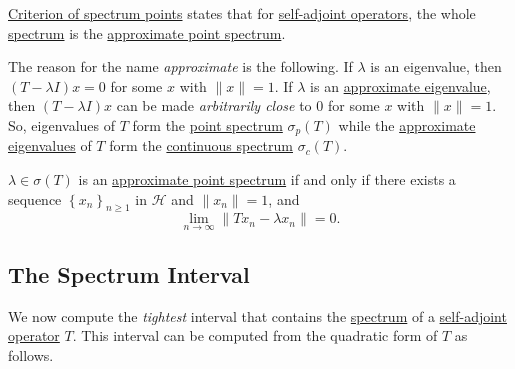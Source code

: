 \hyperref[col:criterion-of-spectrum-points]{Criterion of spectrum points} states that for \hyperref[def:self-adjoint-op]{self-adjoint operators}, the whole \hyperref[def:spectrum-point]{spectrum} is the \hyperref[def:approximate-point-spectrum]{approximate point spectrum}.

The reason for the name \emph{approximate} is the following. If \(\lambda\) is an eigenvalue, then \((T-\lambda I)x = 0\) for some \(x\) with \(\lVert x \rVert = 1\). If \(\lambda \) is an \hyperref[def:approximate-eigenvalue]{approximate eigenvalue}, then \((T-\lambda I)x\) can be made \emph{arbitrarily close} to \(0\) for some \(x\) with \(\lVert x \rVert = 1\). So, eigenvalues of \(T\) form the \hyperref[def:point-spectrum]{point spectrum} \(\sigma _p(T)\) while the \hyperref[def:approximate-eigenvalue]{approximate eigenvalues} of \(T\) form the \hyperref[def:continuous-spectrum]{continuous spectrum} \(\sigma _c(T)\).

\begin{remark}
	\(\lambda \in \sigma (T)\) is an \hyperref[def:approximate-point-spectrum]{approximate point spectrum} if and only if there exists a sequence \(\left\{ x_n \right\} _{n\geq 1}\) in \(\mathcal{H} \) and \(\lVert x_n \rVert = 1\), and
	\[
		\lim_{n \to \infty} \lVert Tx_n - \lambda x_n \rVert = 0.
	\]
\end{remark}

\subsection{The Spectrum Interval}
We now compute the \emph{tightest} interval that contains the \hyperref[def:spectrum-point]{spectrum} of a \hyperref[def:self-adjoint-op]{self-adjoint operator} \(T\). This interval can be computed from the quadratic form of \(T\) as follows.

